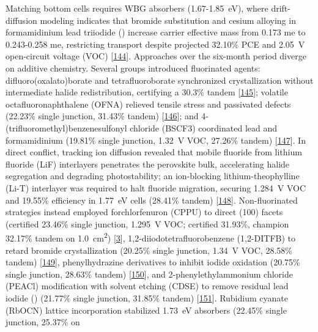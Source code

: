 \documentclass[
  11pt,
]{article}
\begin{document}
Matching bottom cells requires WBG absorbers
(1.67-\qty{1.85}{\electronvolt}), where drift-diffusion modeling
indicates that bromide substitution and cesium alloying in formamidinium
lead triiodide () increase carrier effective mass from 0.173
me to 0.243-0.258 me, restricting transport despite projected 32.10\%
PCE and \qty{2.05}{\volt} open-circuit voltage (VOC)
{[}\href{https://doi.org/10.26434/chemrxiv.15001694/v1}{144}{]}.
Approaches over the six-month period diverge on additive chemistry.
Several groups introduced fluorinated agents: difluoro(oxalato)borate
and tetrafluoroborate synchronized crystallization without intermediate
halide redistribution, certifying a 30.3\% tandem
{[}\href{https://doi.org/10.1038/s41565-026-02165-6}{145}{]}; volatile
octafluoronaphthalene (OFNA) relieved tensile stress and passivated
defects (22.23\% single junction, 31.43\% tandem)
{[}\href{https://doi.org/10.1002/adfm.202526009}{146}{]}; and
4-(trifluoromethyl)benzenesulfonyl chloride (BSCF3) coordinated lead and
formamidinium (19.81\% single junction, \qty{1.32}{\volt} VOC, 27.26\%
tandem) {[}\href{https://doi.org/10.1002/solr.70387}{147}{]}. In direct
conflict, tracking ion diffusion revealed that mobile fluoride from
lithium fluoride (LiF) interlayers penetrates the perovskite bulk,
accelerating halide segregation and degrading photostability; an
ion-blocking lithium-theophylline (Li-T) interlayer was required to halt
fluoride migration, securing \qty{1.284}{\volt} VOC and 19.55\%
efficiency in \qty{1.77}{\electronvolt} cells (28.41\% tandem)
{[}\href{https://doi.org/10.1002/aenm.202506634}{148}{]}.
Non-fluorinated strategies instead employed forchlorfenuron (CPPU) to
direct (100) facets (certified 23.46\% single junction,
\qty{1.295}{\volt} VOC; certified 31.93\%, champion 32.17\% tandem on
\qty{1.0}{\centi\meter\squared})
{[}\href{https://doi.org/10.1016/j.esci.2026.100563}{3}{]},
1,2-diiodotetrafluorobenzene (1,2-DITFB) to retard bromide
crystallization (20.25\% single junction, \qty{1.34}{\volt} VOC, 28.58\%
tandem) {[}\href{https://doi.org/10.1002/adfm.74659}{149}{]},
phenylhydrazine derivatives to inhibit iodide oxidation (20.75\% single
junction, 28.63\% tandem)
{[}\href{https://doi.org/10.1002/smll.202510652}{150}{]}, and
2-phenylethylammonium chloride (PEACl) modification with solvent etching
(CDSE) to remove residual lead iodide () (21.77\% single
junction, 31.85\% tandem)
{[}\href{https://doi.org/10.1002/aenm.202506619}{151}{]}. Rubidium
cyanate (RbOCN) lattice incorporation stabilized
\qty{1.73}{\electronvolt} absorbers (22.45\% single junction, 25.37\% on
\end{document}
